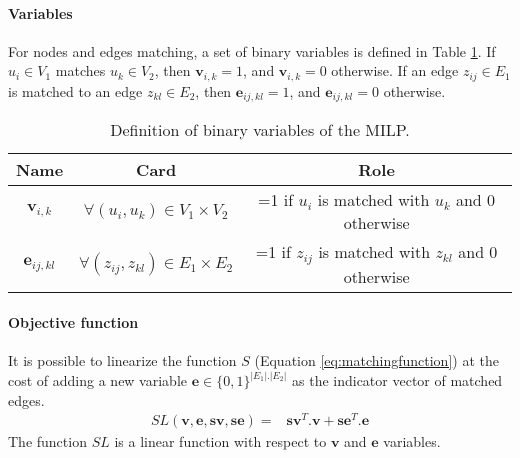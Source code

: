 \documentclass[times,onecolumn,final,authoryear]{article}
\theoremstyle{definition}
\begin{document}
 

\paragraph{Variables}
 For nodes and edges matching, a set of binary variables is defined in Table \ref{tab:ILPvar}.
 If $u_i \in V_1$ matches $u_k \in V_2$, then $\textbf{v}_{i,k}=1$, and $\textbf{v}_{i,k}=0$ otherwise.
 If an edge $z_{ij} \in E_1$ is matched to an edge $z_{kl} \in E_2$, then $\textbf{e}_{ij,kl}=1$, and $\textbf{e}_{ij,kl}=0$ otherwise.
 
 

\begin{table}[htbp]
    \centering
    \caption{Definition of binary variables of the MILP.}
    \begin{tabular}{|c||c|c|}
    \hline
         Name & Card & Role  \\\hline\hline
         $\mathbf{v}_{i,k}$& $\forall (u_i,u_k) \in V_1 \times V_2$ & =1 if $u_i$ is matched with $u_k$ and 0 otherwise\\\hline
         $ \mathbf{e}_{ij,kl}$& $\forall (z_{ij},z_{kl}) \in E_1 \times E_2$ & =1 if $z_{ij}$ is matched with $z_{kl}$ and 0 otherwise\\\hline
    \end{tabular}
    \label{tab:ILPvar}
\end{table}
 
 
 \paragraph{Objective function}
 It is possible to linearize the function $S$ (Equation \eqref{eq:matchingfunction}) at the cost of adding a new variable $\textbf{e} \in \{0,1 \}^{|E_1| . |E_2|}$ as the indicator vector of matched edges.
\begin{equation}
  \label{eq:matchingfunctionlinear}
  \begin{aligned}
  SL(\textbf{v},\textbf{e},\mathbf{sv},\mathbf{se}) =& \mathbf{sv}^{T}.\mathbf{v} +  \mathbf{se}^{T}.\mathbf{e}
    \end{aligned}
\end{equation}
The function $SL$ is a linear function with respect to $\mathbf{v}$ and $\mathbf{e}$ variables.
\end{document}
